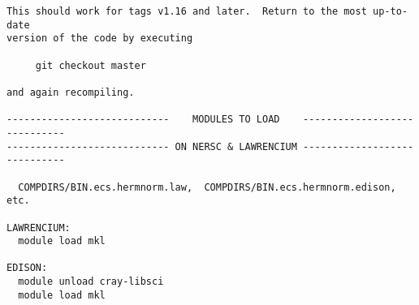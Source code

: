 \begin{verbatim}
This should work for tags v1.16 and later.  Return to the most up-to-date 
version of the code by executing

     git checkout master

and again recompiling.

----------------------------    MODULES TO LOAD    -----------------------------
---------------------------- ON NERSC & LAWRENCIUM -----------------------------

  COMPDIRS/BIN.ecs.hermnorm.law,  COMPDIRS/BIN.ecs.hermnorm.edison, etc.

LAWRENCIUM:
  module load mkl

EDISON:
  module unload cray-libsci
  module load mkl
\end{verbatim}
